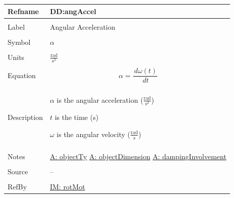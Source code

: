 \documentclass[12pt]{article}
\begin{document}
\noindent \begin{minipage}{\textwidth}
          \begin{tabular}{>{\raggedright}p{}>{\raggedright\arraybackslash}p{}}
          \toprule \textbf{Refname} & \textbf{DD:angAccel}
          \label{DD:angAccel}
          \\ \midrule \\
          Label & Angular Acceleration
          \\ \midrule \\
          Symbol & $α$
          \\ \midrule \\
          Units & $\frac{\text{rad}}{\text{s}^{2}}$
          \\ \midrule \\
          Equation & \begin{displaymath}
                     α=\frac{\,dω\left(t\right)}{\,dt}
                     \end{displaymath}
          \\ \midrule \\
          Description & \begin{symbDescription}
                        \item{$α$ is the angular acceleration ($\frac{\text{rad}}{\text{s}^{2}}$)}
                        \item{$t$ is the time (s)}
                        \item{$ω$ is the angular velocity ($\frac{\text{rad}}{\text{s}}$)}
                        \end{symbDescription}
          \\ \midrule \\
          Notes & \hyperref[assumpOT]{A: objectTy}
                  \hyperref[assumpOD]{A: objectDimension}
                  \hyperref[assumpDI]{A: dampingInvolvement}
          \\ \midrule \\
          Source & --
          \\ \midrule \\
          RefBy & \hyperref[IM:rotMot]{IM: rotMot}
          \\ \bottomrule
          \end{tabular}
          \end{minipage}
\par~
\end{document}
